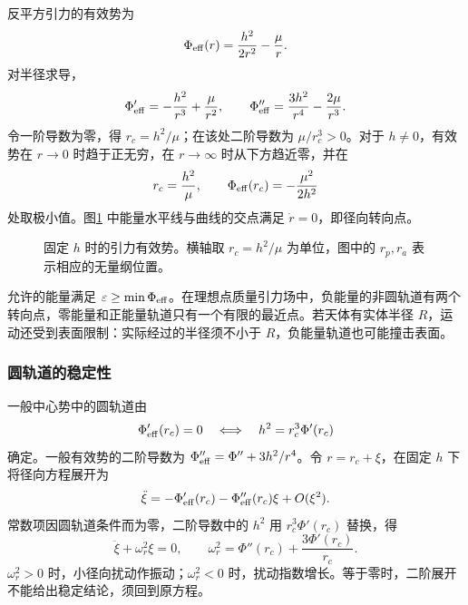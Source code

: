 反平方引力的有效势为
\begin{equation}
 \Phi_{\rm eff}(r)=\frac{h^2}{2r^2}-\frac{\mu}{r}.
\end{equation}
对半径求导，
\[
\Phi_{\rm eff}'=-\frac{h^2}{r^3}+\frac\mu{r^2},\qquad
\Phi_{\rm eff}''=\frac{3h^2}{r^4}-\frac{2\mu}{r^3}.
\]
令一阶导数为零，得 $r_c=h^2/\mu$；在该处二阶导数为 $\mu/r_c^3>0$。对于 $h\ne0$，有效势在 $r\to0$ 时趋于正无穷，在 $r\to\infty$ 时从下方趋近零，并在
\[
 r_c=\frac{h^2}{\mu},\qquad
 \Phi_{\rm eff}(r_c)=-\frac{\mu^2}{2h^2}
\]
处取极小值。图\ref{sup8:fig:d8-effective} 中能量水平线与曲线的交点满足 $\dot r=0$，即径向转向点。

\begin{figure}[H]\centering
{}
\caption{固定 $h$ 时的引力有效势。横轴取 $r_c=h^2/\mu$ 为单位，图中的 $r_p,r_a$ 表示相应的无量纲位置。}\label{sup8:fig:d8-effective}
\end{figure}

允许的能量满足 $\varepsilon\ge\min\Phi_{\rm eff}$。在理想点质量引力场中，负能量的非圆轨道有两个转向点，零能量和正能量轨道只有一个有限的最近点。若天体有实体半径 $R$，运动还受到表面限制：实际经过的半径须不小于 $R$，负能量轨道也可能撞击表面。

\subsubsection{圆轨道的稳定性}

一般中心势中的圆轨道由
\[
 \Phi_{\rm eff}'(r_c)=0
 \quad\Longleftrightarrow\quad
 h^2=r_c^3\Phi'(r_c)
\]
确定。一般有效势的二阶导数为 $\Phi_{\rm eff}''=\Phi''+3h^2/r^4$。令 $r=r_c+\xi$，在固定 $h$ 下将径向方程展开为
\[
\ddot\xi=-\Phi_{\rm eff}'(r_c)-\Phi_{\rm eff}''(r_c)\xi+O(\xi^2).
\]
常数项因圆轨道条件而为零，二阶导数中的 $h^2$ 用 $r_c^3\Phi'(r_c)$ 替换，得
\begin{equation}\label{sup8:eq:d8-stability}
 \ddot\xi+\omega_r^2\xi=0,\qquad
 \omega_r^2=\Phi''(r_c)+\frac{3\Phi'(r_c)}{r_c}.
\end{equation}
$\omega_r^2>0$ 时，小径向扰动作振动；$\omega_r^2<0$ 时，扰动指数增长。等于零时，二阶展开不能给出稳定结论，须回到原方程。

